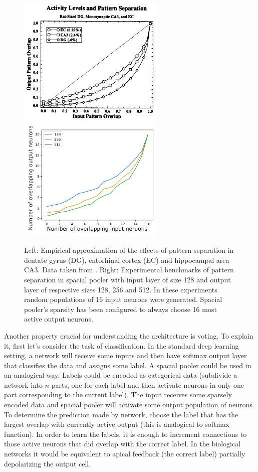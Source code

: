 \documentclass[12pt]{article}
\begin{document}
 \begin{figure}[!htbp]
 	\includegraphics[width=7cm]{dg_pattern_sep}
   \includegraphics[width=7cm]{exp_pattern_sep}
 	\caption{Left: Empirical approximation of the effects of pattern separation in dentate gyrus (DG), entorhinal cortex (EC) and hippocampal area CA3. Data taken from \cite{dg_pattern_sep}. Right: Experimental benchmarks of pattern separation in spacial pooler with input layer of size 128 and output layer of respective sizes 128, 256 and 512. In these experiments random populations of 16 input neurons were generated. Spacial pooler's sparsity has been configured to always choose 16 most active output neurons.}
 	\label{fig:dg_pattern_sep}
 \end{figure}


Another property crucial for understanding the architecture is voting. To explain it, first let's consider the task of classification. In the standard deep learning setting, a network will receive some inputs and then have softmax output layer that classifies  the data and assigns some label. A spacial pooler could be used in an analogical way. Labels could be encoded as categorical data\cite{bami, Encoding_Data_for_HTM} (subdivide a network into $n$ parts, one for each label and then activate neurons in only one part corresponding to the current label). The input receives some sparsely encoded data and spacial pooler will activate some output population of neurons. To determine the prediction made by network, choose the label that has the largest overlap with currently active output (this is analogical to softmax function). In order to learn the labels, it is enough to increment connections to those active neurons that did overlap with the correct label. In the biological networks it would be equivalent to apical feedback (the correct label) partially depolarizing the output cell. 
\end{document}
